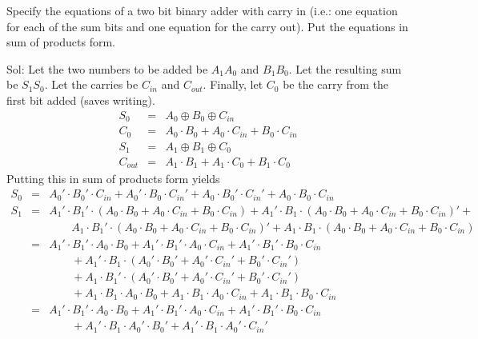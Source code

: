 \begin{example}
Specify the equations of a two bit binary adder with carry in (i.e.: one equation for each of the sum bits and one equation for the carry out).  Put the equations in sum of products form.

{\color{ans}Sol:
Let the two numbers to be added be $A_1 A_0$ and $B_1 B_0$.  Let the resulting sum be $S_1 S_0$.  Let the carries be $C_{in}$ and $C_{out}$.  Finally, let $C_0$ be the carry from the first bit added (saves writing).
\begin{eqnarray*}
S_0 & = & A_0 \oplus B_0 \oplus C_{in} \\
C_0 & = & A_0\cdot B_0 + A_0\cdot C_{in} + B_0\cdot C_{in} \\
S_1 & = & A_1 \oplus B_1 \oplus C_0\\
C_{out} & = & A_1 \cdot B_1 + A_1 \cdot C_0 + B_1 \cdot C_0
\end{eqnarray*}
Putting this in sum of products form yields
\begin{eqnarray*}
S_0 & = & A_0' \cdot B_0' \cdot C_{in} +
          A_0' \cdot B_0 \cdot C_{in}' +
          A_0 \cdot B_0' \cdot C_{in}' +
          A_0 \cdot B_0 \cdot C_{in} \\
S_1 & = & A_1' \cdot B_1' \cdot (A_0\cdot B_0 + A_0\cdot C_{in} + B_0\cdot C_{in}) +
          A_1' \cdot B_1 \cdot (A_0\cdot B_0 + A_0\cdot C_{in} + B_0\cdot C_{in})' + \\
    & & \qquad A_1 \cdot B_1' \cdot (A_0\cdot B_0 + A_0\cdot C_{in} + B_0\cdot C_{in})' +
          A_1 \cdot B_1 \cdot (A_0\cdot B_0 + A_0\cdot C_{in} + B_0\cdot C_{in}) \\
    & = & A_1' \cdot B_1' \cdot A_0\cdot B_0 + A_1' \cdot B_1' \cdot A_0 \cdot C_{in}
          + A_1' \cdot B_1' \cdot B_0\cdot C_{in} \\
    & & \qquad
          + A_1' \cdot B_1 \cdot (A_0'\cdot B_0' + A_0'\cdot C_{in}' + B_0'\cdot C_{in}') \\
    & & \qquad
          + A_1 \cdot B_1' \cdot (A_0'\cdot B_0' + A_0'\cdot C_{in}' + B_0'\cdot C_{in}') \\
    & & \qquad
          + A_1 \cdot B_1 \cdot A_0\cdot B_0 + A_1 \cdot B_1 \cdot A_0\cdot C_{in}
           + A_1 \cdot B_1 \cdot B_0\cdot C_{in} \\
    & = & A_1' \cdot B_1' \cdot A_0\cdot B_0 + A_1' \cdot B_1' \cdot A_0 \cdot C_{in}
          + A_1' \cdot B_1' \cdot B_0\cdot C_{in} \\
    & & \qquad
          + A_1' \cdot B_1 \cdot A_0'\cdot B_0' + A_1' \cdot B_1 \cdot A_0'\cdot C_{in}'

\end{eqnarray*}}
\end{example}
